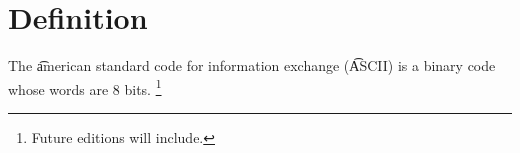 
\section*{Definition}

The \t{american standard code for information exchange} (\t{ASCII}) is a binary code whose words are 8 bits.
    \ifhmode\unskip\fi\footnote{
Future editions will include.
    }

\blankpage